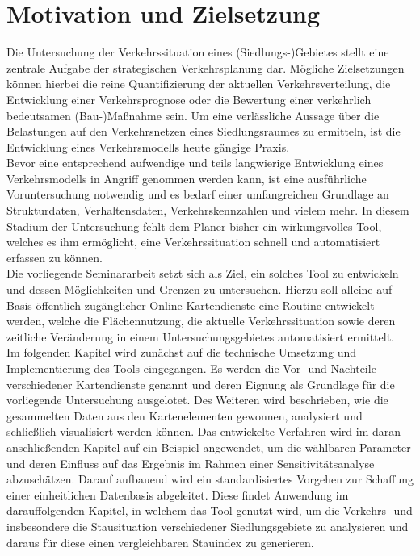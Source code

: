 \section{Motivation und Zielsetzung}

Die Untersuchung der Verkehrssituation eines (Siedlungs-)Gebietes stellt eine zentrale Aufgabe der strategischen Verkehrsplanung dar. Mögliche Zielsetzungen können hierbei die reine Quantifizierung der aktuellen Verkehrsverteilung, die Entwicklung einer Verkehrsprognose oder die Bewertung einer verkehrlich bedeutsamen (Bau-)Maßnahme sein. Um eine verlässliche Aussage über die Belastungen auf den Verkehrsnetzen eines Siedlungsraumes zu ermitteln, ist die Entwicklung eines Verkehrsmodells heute gängige Praxis.\\

Bevor eine entsprechend aufwendige und teils langwierige Entwicklung eines Verkehrsmodells in Angriff genommen werden kann, ist eine ausführliche Voruntersuchung notwendig und es bedarf einer umfangreichen Grundlage an Strukturdaten, Verhaltensdaten, Verkehrskennzahlen und vielem mehr. In diesem Stadium der Untersuchung fehlt dem Planer bisher ein wirkungsvolles Tool, welches es ihm ermöglicht, eine Verkehrssituation schnell und automatisiert erfassen zu können.\\

Die vorliegende Seminararbeit setzt sich als Ziel, ein solches Tool zu entwickeln und dessen Möglichkeiten und Grenzen zu untersuchen. Hierzu soll alleine auf Basis öffentlich zugänglicher Online-Kartendienste eine Routine entwickelt werden, welche die Flächennutzung, die aktuelle Verkehrssituation sowie deren zeitliche Veränderung in einem Untersuchungsgebietes automatisiert ermittelt.\\

Im folgenden Kapitel wird zunächst auf die technische Umsetzung und Implementierung des Tools eingegangen. Es werden die Vor- und Nachteile verschiedener Kartendienste genannt und deren Eignung als Grundlage für die vorliegende Untersuchung ausgelotet. Des Weiteren wird beschrieben, wie die gesammelten Daten aus den Kartenelementen gewonnen, analysiert und schließlich visualisiert werden können. Das entwickelte Verfahren wird im daran anschließenden Kapitel auf ein Beispiel angewendet, um die wählbaren Parameter und deren Einfluss auf das Ergebnis im Rahmen einer Sensitivitätsanalyse abzuschätzen. Darauf aufbauend wird ein standardisiertes Vorgehen zur Schaffung einer einheitlichen Datenbasis abgeleitet. Diese findet Anwendung im darauffolgenden Kapitel, in welchem das Tool genutzt wird, um die Verkehrs- und insbesondere die Stausituation verschiedener Siedlungsgebiete zu analysieren und daraus für diese einen vergleichbaren Stauindex zu generieren.
